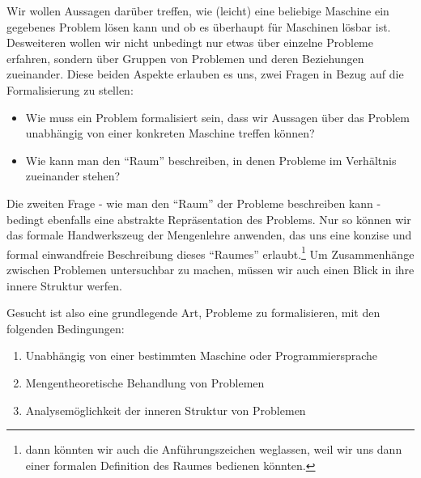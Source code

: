 Wir wollen Aussagen darüber treffen,
wie (leicht) eine beliebige Maschine ein gegebenes Problem lösen kann
und ob es überhaupt für Maschinen lösbar ist.
Desweiteren wollen wir nicht unbedingt nur etwas über einzelne Probleme erfahren,
sondern über Gruppen von Problemen und deren Beziehungen zueinander.
Diese beiden Aspekte erlauben es uns,
zwei Fragen in Bezug auf die Formalisierung zu stellen:
\begin{itemize}
\item Wie muss ein Problem formalisiert sein,
      dass wir Aussagen über das Problem unabhängig von einer konkreten Maschine treffen können?
\item Wie kann man den ``Raum'' beschreiben, in denen Probleme im Verhältnis zueinander stehen?
\end{itemize}


Die zweiten Frage - wie man den ``Raum'' der Probleme beschreiben kann -
bedingt ebenfalls eine abstrakte Repräsentation des Problems.
Nur so können wir das formale Handwerkszeug der Mengenlehre anwenden,
das uns eine konzise und formal einwandfreie Beschreibung dieses ``Raumes'' erlaubt.\footnote{
dann könnten wir auch die Anführungszeichen weglassen, weil wir uns dann einer formalen Definition des Raumes
bedienen könnten.}
Um Zusammenhänge zwischen Problemen untersuchbar zu machen,
müssen wir auch einen Blick in ihre innere Struktur werfen.

Gesucht ist also eine grundlegende Art, Probleme zu formalisieren, mit den folgenden Bedingungen:
\begin{enumerate}
 \item Unabhängig von einer bestimmten Maschine oder Programmiersprache
 \item Mengentheoretische Behandlung von Problemen
 \item Analysemöglichkeit der inneren Struktur von Problemen
\end{enumerate}

